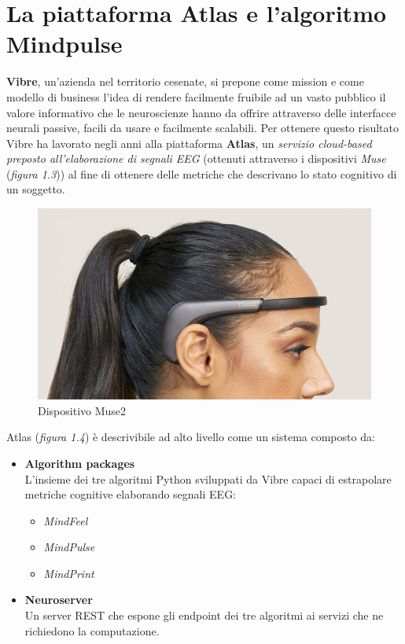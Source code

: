 \section{La piattaforma Atlas e l'algoritmo Mindpulse}
{\bf Vibre}, un'azienda nel territorio cesenate, si prepone come mission e come modello di business l'idea di rendere facilmente fruibile ad un vasto pubblico il valore informativo che le neuroscienze hanno da offrire attraverso delle interfacce neurali passive, facili da usare e facilmente scalabili.\newline
Per ottenere questo risultato Vibre ha lavorato negli anni alla piattaforma {\bf Atlas}, un \emph{servizio cloud-based preposto all'elaborazione di segnali EEG} (ottenuti attraverso i dispositivi \emph{Muse} \cite{muse} (\emph{figura 1.3})) al fine di ottenere delle metriche che descrivano lo stato cognitivo di un soggetto.\newline
\begin{figure}[H]
  \centering
  \includegraphics[width=1.0\textwidth]{img/muse2.jpg}
  \caption{Dispositivo Muse2 \cite{immagine_muse}}
\end{figure}
\vspace{8mm}
Atlas (\emph{figura 1.4}) è descrivibile ad alto livello come un sistema composto da:
\begin{itemize}
  \item \textbf{Algorithm packages}\\
  L'insieme dei tre algoritmi Python sviluppati da Vibre capaci di estrapolare metriche cognitive elaborando segnali EEG:
  \begin{itemize}
    \item \emph{MindFeel}
    \item \emph{MindPulse}
    \item \emph{MindPrint}
  \end{itemize}
  \item \textbf{Neuroserver}\\
  Un server REST che espone gli endpoint dei tre algoritmi ai servizi che ne richiedono la computazione.
\end{itemize}
